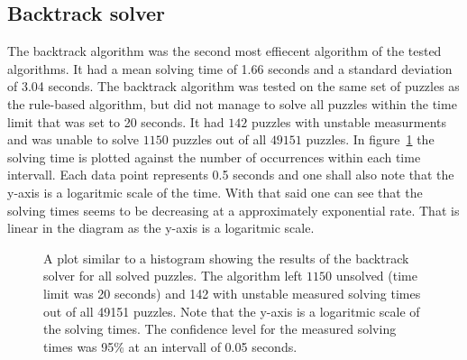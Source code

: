 \documentclass[a4paper,11pt]{kth-mag}
\begin{document}
\subsection{Backtrack solver}
\label{sec:backtrack}
The backtrack algorithm was the second most effiecent algorithm of the tested algorithms.
It had a mean solving time of 1.66 seconds and a standard deviation of 3.04 seconds.
The backtrack algorithm was tested on the same set of puzzles as the rule-based algorithm, but did not manage to solve all puzzles within the time limit that was set to 20 seconds.
It had $142$ puzzles with unstable measurments and was unable to solve $1150$ puzzles out of all $49151$ puzzles.
In figure~\ref{fig:backtrackDistribution} the solving time is plotted against the number of occurrences within each time intervall.
Each data point represents 0.5 seconds and one shall also note that the y-axis is a logaritmic scale of the time.
With that said one can see that the solving times seems to be decreasing at a approximately exponential rate.
That is linear in the diagram as the y-axis is a logaritmic scale.

\begin{figure}[here] 
\noindent{}
\vspace{-15pt}
\caption{A plot similar to a histogram showing the results of the backtrack solver for all solved puzzles. The algorithm left $1150$ unsolved (time limit was 20 seconds) and 142 with unstable measured solving times out of all 49151 puzzles. Note that the y-axis is a logaritmic scale of the solving times. The confidence level for the measured solving times was 95\% at an intervall of 0.05 seconds.}
\label{fig:backtrackDistribution}
\end{figure}
\end{document}
